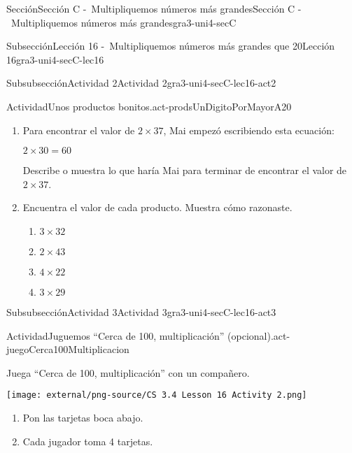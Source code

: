\documentclass[twoside,10pt,]{article}
\begin{document}
\begin{sectionptx}{Sección}{Sección C -~Multipliquemos números más grandes}{}{Sección C -~Multipliquemos números más grandes}{}{}{gra3-uni4-secC}
\begin{subsectionptx}{Subsección}{Lección 16 -~Multipliquemos números más grandes que 20}{}{Lección 16}{}{}{gra3-uni4-secC-lec16}
\typeout{************************************************}
%
\begin{subsubsectionptx}{Subsubsección}{Actividad 2}{}{Actividad 2}{}{}{gra3-uni4-secC-lec16-act2}
\begin{activity}{Actividad}{Unos productos bonitos.}{act-prodsUnDigitoPorMayorA20}%
%
\begin{enumerate}
\item{}Para encontrar el valor de \(2\times 37\), Mai empezó escribiendo esta ecuación:%
\par
\(2 \times 30 = 60\)%
\par
Describe o muestra lo que haría Mai para terminar de encontrar el valor de \(2\times 37\).%
\item{}Encuentra el valor de cada producto. Muestra cómo razonaste.%
%
\begin{enumerate}
\item{}\(\displaystyle 3\times 32\)%
\item{}\(\displaystyle 2\times 43\)%
\item{}\(\displaystyle 4\times 22\)%
\item{}\(\displaystyle 3\times 29\)%
\end{enumerate}
\end{enumerate}
\end{activity}%
\end{subsubsectionptx}
%
%
\typeout{************************************************}
\typeout{************************************************}
%
\begin{subsubsectionptx}{Subsubsección}{Actividad 3}{}{Actividad 3}{}{}{gra3-uni4-secC-lec16-act3}
\begin{activity}{Actividad}{Juguemos “Cerca de 100, multiplicación” (opcional).}{act-juegoCerca100Multiplicacion}%
\begin{sidebyside}{2}{0.05}{0.05}{0.1}%
\begin{sbspanel}{0.5}%
Juega “Cerca de 100, multiplicación” con un compañero.%
\end{sbspanel}%
\begin{sbspanel}{0.3}%
\texttt{[image: external/png-source/CS 3.4 Lesson 16 Activity 2.png]}
\end{sbspanel}%
\end{sidebyside}%
%
\begin{enumerate}
\item{}Pon las tarjetas boca abajo.%
\item{}Cada jugador toma 4 tarjetas.%

\end{enumerate}
\end{activity}
\end{subsubsectionptx}
\end{subsectionptx}
\end{sectionptx}
\end{document}
